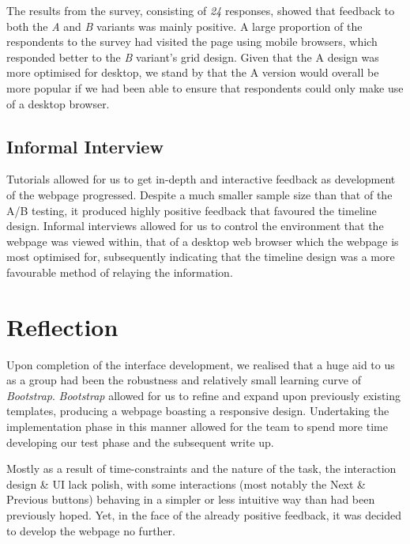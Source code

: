 \documentclass[a4paper, notoc]{tufte-handout}
\begin{document}
The results from the survey, consisting of \emph{24} responses, showed that feedback to both
the \textit{A} and \textit{B} variants was mainly positive. A large proportion of the respondents to the
survey had visited the page using mobile browsers, which responded better to the \textit{B} variant's grid design.
Given that the A design was more optimised for desktop, we stand by that the A version would overall be more popular if we had been able to ensure that respondents could only make
use of a desktop browser.

\subsection{Informal Interview}\label{subsec:interview}

Tutorials allowed for us to get in-depth and interactive feedback as development of the webpage progressed. Despite a much smaller sample size than that of the A/B testing, it produced highly positive feedback that favoured the timeline design. Informal interviews allowed for us to control the environment that the webpage was viewed within, that of a desktop web browser which the webpage is most optimised for, subsequently indicating that the timeline design was a more favourable method of relaying the information.

\section{Reflection}


Upon completion of the interface development, we realised that a huge aid to us as a group had been 
the robustness and relatively small learning curve of \textit{Bootstrap}. \textit{Bootstrap} 
allowed for us to refine and expand upon previously existing templates, producing a webpage 
boasting a responsive design. Undertaking the implementation phase in this manner allowed for 
the team to spend more time developing our test phase and the subsequent write up.

Mostly as a result of time-constraints and the nature of the task, the interaction design \& UI lack 
polish, with some interactions (most notably the Next \& Previous buttons) behaving in a simpler 
or less intuitive way than had been previously hoped. Yet, in the face of the already positive feedback, it was 
decided to develop the webpage no further.
\end{document}
